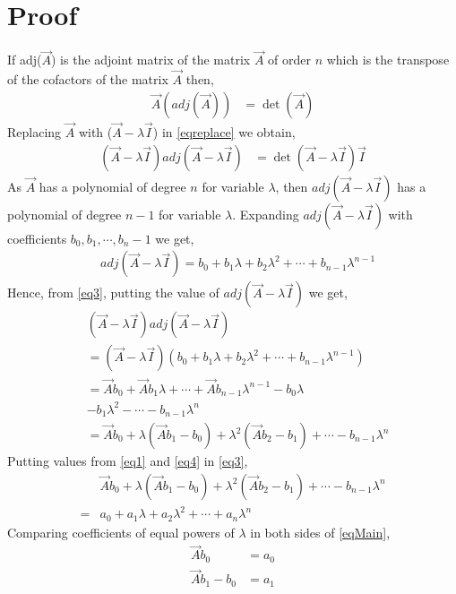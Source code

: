 \documentclass[journal,12pt,twocolumn]{IEEEtran}
\begin{document}
\section{Proof}
If adj($\vec{A}$) is the adjoint matrix of the matrix $\vec{A}$ of order $n$ which is the transpose of the cofactors of the matrix $\vec{A}$ then, 
\begin{align} 
\vec{A}(adj(\vec{A})) &= \det(\vec{A})\label{eqreplace}
\end{align}
Replacing $\vec{A}$ with ($\vec{A}-\lambda\vec{I}$) in \eqref{eqreplace} we obtain,
\begin{align}
(\vec{A}-\lambda\vec{I})adj(\vec{A}-\lambda\vec{I}) &= \det(\vec{A}-\lambda\vec{I})\vec{I}\label{eq3}
\end{align}
As $\vec{A}$ has a polynomial of degree $n$ for variable $\lambda$, then
$adj(\vec{A}-\lambda\vec{I})$ has a polynomial of degree $n-1$ for variable $\lambda$. Expanding $adj(\vec{A}-\lambda\vec{I})$ with coefficients $b_0,b_1,\cdots,b_n-1$ we get,
\begin{align} 
& adj(\vec{A}-\lambda\vec{I}) = b_0 + b_1\lambda + b_2\lambda^{2} +  \cdots+b_{n-1}\lambda^{n-1}
\end{align}
Hence, from \eqref{eq3}, putting the value of $adj(\vec{A}-\lambda\vec{I})$ we get,
\begin{align}
& (\vec{A}-\lambda\vec{I}) adj(\vec{A}-\lambda\vec{I}) \\&= (\vec{A}-\lambda\vec{I})(b_0 + b_1\lambda + b_2\lambda^{2} +  \cdots+b_{n-1}\lambda^{n-1})\\
&= \vec{A}b_0 + \vec{A}b_1\lambda +\cdots+ \vec{A}b_{n-1}\lambda^{n-1}- b_0\lambda\\ 
&    - b_1\lambda^{2}-\cdots - b_{n-1}\lambda^{n}\\
&=\vec{A}b_0 + \lambda(\vec{A}b_1 - b_0) + \lambda^{2}(\vec{A}b_2 - b_1) + \cdots - b_{n-1}\lambda^{n}  \label{eq4}
\end{align}
Putting values from \eqref{eq1} and \eqref{eq4}  in \eqref{eq3},
\begin{align} 
&\vec{A}b_0 + \lambda(\vec{A}b_1 - b_0) + \lambda^{2}(\vec{A}b_2 - b_1) + \cdots - b_{n-1}\lambda^{n} \\=
&a_0 + a_1\lambda + a_2\lambda^{2} +  \cdots+a_n\lambda^{n}\label{eqMain}
\end{align}
Comparing coefficients of equal powers of $\lambda$ in both sides of \eqref{eqMain},
\begin{align}
\vec{A}b_0 &= a_0 \label{eqS1}\\
\vec{A}b_1 - b_0 &= a_1 \label{eqS2}
\end{align}
\end{document}

